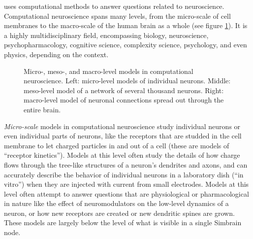  uses computational methods to answer questions related to neuroscience. Computational neuroscience spans many levels, from the micro-scale of cell membranes to the macro-scale of the human brain as a whole (see figure \ref{compNeuro}). It is a highly multidisciplinary field, encompassing biology, neuroscience, psychopharmacology, cognitive science, complexity science, psychology, and even physics, depending on the context. 

\begin{figure}[h]
\centering
{}
\caption[Layout by Pamela Payne. Top Left: ; Bottom Left: ; Middle: Screenshot by Zach Tosi ; Right: From Hagmann et al., 2008 \cite{hagmann2008mapping}, Licensed Under CC BY]{Micro-, meso-, and macro-level models in computational neuroscience. Left: micro-level models of individual neurons. Middle: meso-level model of a network of several thousand neurons. Right: macro-level model of neuronal connections spread out through the entire brain.}
\label{compNeuro}
\end{figure}

\emph{Micro-scale} models in computational neuroscience study individual neurons or even individual parts of neurons, like the receptors that are studded in the cell membrane to let charged particles in and out of a cell (these are models of ``receptor kinetics''). Models at this level often study the details of how charge flows through the tree-like structures of a neuron's dendrites and axons, and can accurately describe the behavior of individual neurons in a laboratory dish (``in vitro'') when they are injected with current from small electrodes. Models at this level often attempt to answer questions that are physiological or pharmacological in nature like the effect of neuromodulators on the low-level dynamics of a neuron, or how new receptors are created or new dendritic spines are grown. These models are largely below the level of what is visible in a single Simbrain node.

